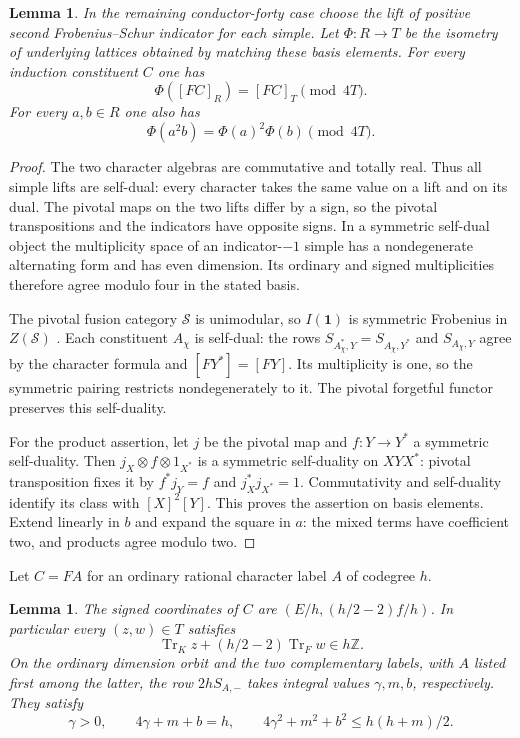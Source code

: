 \documentclass[11pt,reqno]{amsart}
\newtheorem{lemma}[theorem]{Lemma}
\theoremstyle{remark}\newtheorem{remark}[theorem]{Remark}
\numberwithin{equation}{section}
\begin{document}
\begin{lemma}\label{lem:induction-fs-four}
In the remaining conductor-forty case choose the lift of positive second Frobenius--Schur indicator for each simple. Let $\Phi:R\to T$ be the isometry of underlying lattices obtained by matching these basis elements. For every induction constituent $C$ one has
\[
      \Phi([FC]_R)=[FC]_T\pmod {4T}.
\]
For every $a,b\in R$ one also has
\[
      \Phi(a^2 b)=\Phi(a)^2\Phi(b)\pmod {4T}.
\]
\end{lemma}
\begin{proof}
The two character algebras are commutative and totally real. Thus
all simple lifts are self-dual: every character takes the same value
on a lift and on its dual. The pivotal maps on the two lifts differ by a sign, so the pivotal
transpositions and the indicators have opposite signs. In a symmetric self-dual object the multiplicity
space of an indicator-$-1$ simple has a nondegenerate alternating
form and has even dimension. Its ordinary and signed multiplicities
therefore agree modulo four in the stated basis.

The pivotal fusion category $\mathcal S$ is unimodular, so
$I(\mathbf1)$ is symmetric Frobenius in $Z(\mathcal S)$
\cite[Lemma~7.1]{SchweigertWoike}. Each constituent $A_\chi$ is
self-dual: the rows $S_{A_\chi^*,Y}=S_{A_\chi,Y^*}$ and $S_{A_\chi,Y}$
agree by the character formula and $[FY^*]=[FY]$. Its multiplicity
is one, so the symmetric pairing restricts nondegenerately to it.
The pivotal forgetful functor preserves this self-duality.

For the product assertion, let $j$ be the pivotal map and
$f:Y\to Y^*$ a symmetric self-duality. Then
$j_X\otimes f\otimes1_{X^*}$ is a symmetric self-duality on
$XYX^*$: pivotal transposition fixes it by $f^*j_Y=f$ and
$j_X^*j_{X^*}=1$. Commutativity and self-duality identify its class
with $[X]^2[Y]$. This proves the assertion on basis elements.
Extend linearly in $b$ and expand the square in $a$: the mixed
terms have coefficient two, and products agree modulo two.
\end{proof}
Let $C=FA$ for an ordinary rational character label $A$ of codegree $h$.
\begin{lemma}\label{lem:forty-rational-row}
The signed coordinates of $C$ are $(E/h,(h/2-2)f/h)$. In particular
every $(z,w)\in T$ satisfies
\begin{equation}\label{eq:forty-trace-transfer}
       \operatorname{Tr}_K z+(h/2-2)\operatorname{Tr}_F w\in h\mathbb Z.
\end{equation}
On the ordinary dimension orbit and the two complementary labels,
with $A$ listed first among the latter, the row $2hS_{A,-}$ takes
integral values $\gamma,m,b$, respectively. They satisfy
\begin{equation}\label{eq:forty-row-bound}
 \gamma>0,\qquad 4\gamma+m+b=h,\qquad
 4\gamma^2+m^2+b^2\le h(h+m)/2 .
\end{equation}
\end{lemma}
\end{document}
